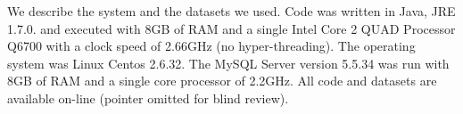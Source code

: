 \documentclass{acm_proc_article-sp}
\begin{document}
We describe the system and the datasets we used.
Code was written in Java, JRE 1.7.0.  and executed with 8GB of RAM and a single Intel Core 2 QUAD Processor Q6700 with a clock speed of 2.66GHz (no hyper-threading). The operating system was Linux Centos 2.6.32. 
The MySQL Server version 5.5.34 was run with 8GB of RAM and a single core processor of 2.2GHz. 
All code and datasets are available on-line (pointer omitted for blind review). 
%
\begin{table}[hbtp] \centering
\caption{Datasets characteristics. \#Tuples = total number of tuples over all tables. 
  \label{table:datasetsize}}
\end{table}
\end{document}
